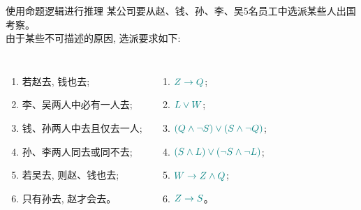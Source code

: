 \begin{frame}{}
  \begin{center}

    \vspace{0.30cm}
  \end{center}
\end{frame}

\begin{frame}{}
  \begin{exampleblock}{使用命题逻辑进行推理}
    某公司要从赵、钱、孙、李、吴5名员工中选派某些人出国考察。\\
    由于某些不可描述的原因, 选派要求如下:

    \begin{columns}
        \begin{enumerate}[(1)]
          \item 若赵去, 钱也去;
          \item 李、吴两人中必有一人去;
          \item 钱、孙两人中去且仅去一人;
          \item 孙、李两人同去或同不去;
          \item 若吴去, 则赵、钱也去;
          \item 只有孙去, 赵才会去。
        \end{enumerate}
        \begin{enumerate}[(1)]
          \item $\textcolor{teal}{Z \to Q}$;
          \item $\textcolor{teal}{L \lor W}$;
          \item $\textcolor{teal}{(Q \land \lnot S) \lor (S \land \lnot Q)}$;
          \item $\textcolor{teal}{(S \land L) \lor (\lnot S \land \lnot L)}$;
          \item $\textcolor{teal}{W \to Z \land Q}$;
          \item $\textcolor{teal}{Z \to S}$。
        \end{enumerate}
    \end{columns}

    \vspace{0.50cm}
  \end{exampleblock}
\end{frame}

